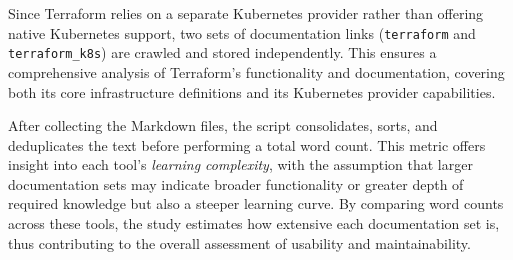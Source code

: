 \documentclass{article}
\begin{document}
Since Terraform relies on a separate Kubernetes provider rather than offering native Kubernetes support, two sets of documentation links (\texttt{terraform} and \texttt{terraform\_k8s}) are crawled and stored independently. This ensures a comprehensive analysis of Terraform’s functionality and documentation, covering both its core infrastructure definitions and its Kubernetes provider capabilities.

After collecting the Markdown files, the script consolidates, sorts, and deduplicates the text before performing a total word count. This metric offers insight into each tool’s \emph{learning complexity}, with the assumption that larger documentation sets may indicate broader functionality or greater depth of required knowledge but also a steeper learning curve. By comparing word counts across these tools, the study estimates how extensive each documentation set is, thus contributing to the overall assessment of usability and maintainability.
\end{document}

